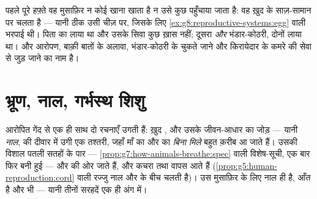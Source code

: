 \begin{example}[पहले बँटवारे जीते किस पर हैं]\label{ex:g8:from-egg-to-birth:provisions}
पहले पूरे हफ़्ते वह मुसाफ़िर न कोई खाना खाता है न उसे कुछ पहुँचाया जाता
है: वह ख़ुद  के साज़-सामान पर चलता है --- यानी ठीक उसी चीज़ पर,
जिसके लिए \cref{ex:g8:reproductive-systems:egg} वाली भरपाई थी। 
पिता का  लाया था और उसके सिवा कुछ ख़ास नहीं;  दूसरा 
\emph{और} भंडार-कोठरी, दोनों लाया था। और आरोपण, बाक़ी बातों के अलावा,
भंडार-कोठरी के चुकते जाने और किरायेदार के कमरे की सेवा से जुड़ जाने का
नाम है।
\end{example}

\section{भ्रूण, नाल, गर्भस्थ शिशु}

\begin{definition}[नाल]\label{def:g8:from-egg-to-birth:placenta}
आरोपित गेंद से एक ही साथ दो रचनाएँ उगती हैं: ख़ुद \emph{}, और
उसके जीवन-आधार का जोड़ --- यानी \emph{नाल},  की
दीवार में उगी एक तश्तरी, जहाँ माँ का  और  का  \emph{बिना
मिले} बहुत क़रीब आ जाते हैं। उसकी विशाल पतली सतहों के पार ---
\cref{prop:g7:how-animals-breathe:spec} वाली विशेष-सूची, एक बार फिर बनी
हुई ---  और   की ओर जाते हैं, और कचरा तथा  वापस आते हैं (\cref{prop:g5:human-reproduction:cord} वाली
रज्जु नाल और  के बीच चलती है)। उस मुसाफ़िर के लिए नाल ही  है,
आँत है और  भी --- यानी तीनों सरहदें एक ही अंग में।
\end{definition}

